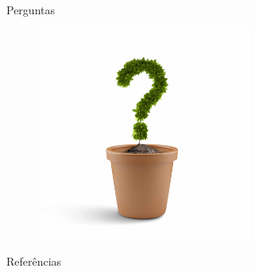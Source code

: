 \begin{frame}{Perguntas}
	\begin{figure}
		\centering
		\includegraphics[width=7cm,keepaspectratio=true]{img/ask.jpg}
	\end{figure}
\end{frame}

\appendix
\begin{frame}[allowframebreaks]{Referências}
        
\end{frame}







